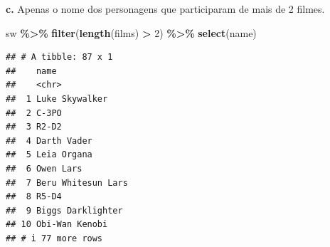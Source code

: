 \documentclass[
]{book}
\newenvironment{Shaded}{\begin{snugshade}}{\end{snugshade}}
\newcommand{\DecValTok}[1]{\textcolor[rgb]{0.00,0.00,0.81}{#1}}
\newcommand{\FunctionTok}[1]{\textcolor[rgb]{0.13,0.29,0.53}{\textbf{#1}}}
\newcommand{\NormalTok}[1]{#1}
\newcommand{\SpecialCharTok}[1]{\textcolor[rgb]{0.81,0.36,0.00}{\textbf{#1}}}
\begin{document}
\textbf{c.} Apenas o nome dos personagens que participaram de mais de 2
filmes.

\begin{Shaded}
\begin{Highlighting}[]
\NormalTok{sw }\SpecialCharTok{\%\textgreater{}\%} 
  \FunctionTok{filter}\NormalTok{(}\FunctionTok{length}\NormalTok{(films) }\SpecialCharTok{\textgreater{}} \DecValTok{2}\NormalTok{) }\SpecialCharTok{\%\textgreater{}\%} 
  \FunctionTok{select}\NormalTok{(name)}
\end{Highlighting}
\end{Shaded}

\begin{verbatim}
## # A tibble: 87 x 1
##    name              
##    <chr>             
##  1 Luke Skywalker    
##  2 C-3PO             
##  3 R2-D2             
##  4 Darth Vader       
##  5 Leia Organa       
##  6 Owen Lars         
##  7 Beru Whitesun Lars
##  8 R5-D4             
##  9 Biggs Darklighter 
## 10 Obi-Wan Kenobi    
## # i 77 more rows
\end{verbatim}

  
\end{document}
